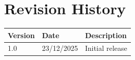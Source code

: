 \setcounter{page}{1}

\chapter*{Revision History}
\begin{table}[H]
\centering
\begin{tabular}{|l|l|p{8cm}|}
\hline
\textbf{Version} & \textbf{Date} & \textbf{Description} \\ \hline
1.0 & 23/12/2025 & Initial release \\ \hline
\end{tabular}
\end{table}

\tableofcontents
\thispagestyle{empty}
\cleardoublepage

\listoffigures
\listoftables
